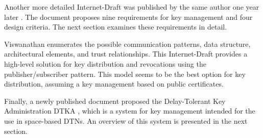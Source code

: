 Another more detailed Internet-Draft was published by the same author one year later \cite{templin-dtnskmreq-00}. The document proposes nine requirements for key management and four design criteria. The next section examines these requirements in detail.

Viswanathan \cite{viswanathan-dtn-pkdn-00} enumerates the possible communication patterns, data structure, architectural elements, and trust relationships.  This Internet-Draft provides a high-level solution for key distribution and revocations using the publisher/subscriber pattern. This model seems to be the best option for key distribution, assuming a key management based on public certificates. 

Finally, a newly published document proposed the Delay-Tolerant Key Administration DTKA \cite{burleigh-dtnwg-dtka-01}, which is a system for key management intended for the use in space-based DTNs. An overview of this system is presented in the next section.










